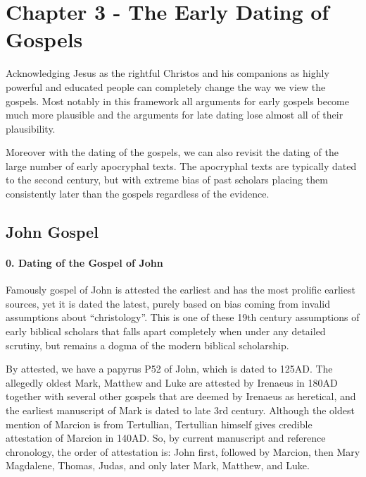 \section{Chapter 3 - The Early Dating of Gospels}\label{sec:chapter-3---the-early-dating-of-gospels}

Acknowledging Jesus as the rightful Christos and his companions as highly powerful and educated people can completely change the way we view the gospels.
Most notably in this framework all arguments for early gospels become much more plausible and the arguments for late dating lose almost all of their plausibility.

Moreover with the dating of the gospels, we can also revisit the dating of the large number of early apocryphal texts.
The apocryphal texts are typically dated to the second century, but with extreme bias of past scholars placing them consistently later than the gospels regardless of the evidence.

\subsection{John Gospel}\label{subsec:john-gospel}

\paragraph{0.
Dating of the Gospel of John}\label{par:dating-of-the-gospel-of-john}

Famously gospel of John is attested the earliest and has the most prolific earliest sources, yet it is dated the latest, purely based on bias coming from invalid assumptions about ``christology''.
This is one of these 19th century assumptions of early biblical scholars that falls apart completely when under any detailed scrutiny, but remains a dogma of the modern biblical scholarship.

By attested, we have a papyrus P52 of John, which is dated to 125AD.
The allegedly oldest Mark, Matthew and Luke are attested by Irenaeus in 180AD together with several other gospels that are deemed by Irenaeus as heretical, and the earliest manuscript of Mark is dated to late 3rd century.
Although the oldest mention of Marcion is from Tertullian, Tertullian himself gives credible attestation of Marcion in 140AD.
So, by current manuscript and reference chronology, the order of attestation is: John first, followed by Marcion, then Mary Magdalene, Thomas, Judas, and only later Mark, Matthew, and Luke.

